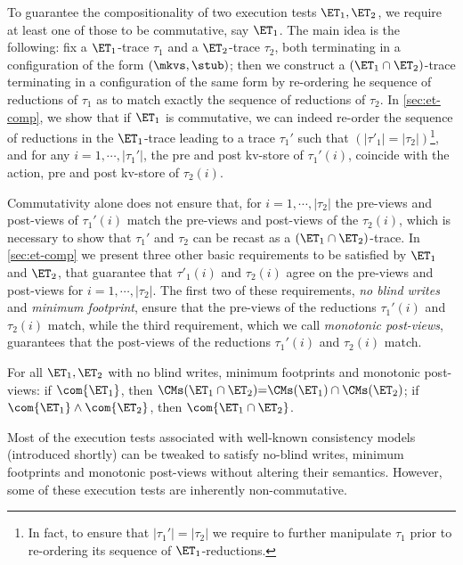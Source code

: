 To guarantee the compositionality of two execution tests $\ET_1, \ET_2$, we 
require at least one of those to be commutative, say $\ET_1$. The main idea 
is the following: fix a $\ET_1$-trace $\tau_1$ and a $\ET_2$-trace $\tau_2$, both terminating in a configuration 
of the form $(\mkvs, \stub)$; then we construct a $(\ET_1 \cap \ET_2)$-trace terminating 
in a configuration of the same form by re-ordering he sequence of 
reductions of $\tau_1$ as to match exactly the sequence of 
reductions of $\tau_2$. 
In \cref{sec:et-comp}, we show that if $\ET_1$ is commutative, 
we can indeed re-order the sequence of reductions in the 
$\ET_1$-trace leading to a trace $\tau_1'$ such that $(\lvert \tau'_1 \rvert = \lvert \tau_2 \rvert)$\footnote{In fact, 
to ensure that $\lvert \tau_1' \rvert = \lvert \tau_2 \rvert$ we require to further manipulate 
$\tau_1$ prior to re-ordering its sequence of $\ET_1$-reductions.}, 
and for any 
$i=1,\cdots, \lvert \tau_1'\rvert$, the pre and post kv-store of $\tau_1'(i)$,
 coincide with the action, pre and post kv-store 
of $\tau_2(i)$.


Commutativity alone does not ensure that, for $i=1,\cdots,\lvert \tau_2 \rvert$ the 
pre-views and post-views of $\tau_1'(i)$ 
match the pre-views and post-views of the $\tau_2(i)$, which is necessary to show 
that $\tau_1'$ and $\tau_2$ can be recast as a $(\ET_1 \cap \ET_2)$-trace. 
In \cref{sec:et-comp} we present three other basic requirements to be 
satisfied by $\ET_1$ and $\ET_2$, that guarantee that $\tau'_1(i)$ and 
$\tau_2(i)$ agree on the pre-views and post-views for $i=1,\cdots, \lvert \tau_2 \rvert$. 
The first two of these requirements,  \emph{no blind writes} and \emph{minimum footprint}, 
ensure that the pre-views of the reductions $\tau_1'(i)$ and $\tau_2(i)$ match, 
while the third requirement, which we call \emph{monotonic post-views}, 
guarantees that the post-views of the reductions $\tau_1'(i)$ and $\tau_2(i)$ 
match. 
 
\begin{theorem}[Compositionality]  
\label{thm:compositional}   
For all $\ET_1, \ET_2$ with no blind writes, minimum footprints and monotonic post-views: 
if $\com{\ET_1}$, 
then $\CMs(\ET_1 \cap \ET_2) {=} \CMs(\ET_1) \cap \CMs(\ET_2)$;
if $\com{\ET_1} \land \com{\ET_2}$, then $\com{\ET_1 \cap \ET_2}$.
\end{theorem}

Most of the execution tests associated with well-known consistency models (introduced shortly)
can be tweaked to satisfy no-blind writes, minimum footprints and monotonic post-views 
without altering their semantics. However, some of these execution tests
are inherently non-commutative.


